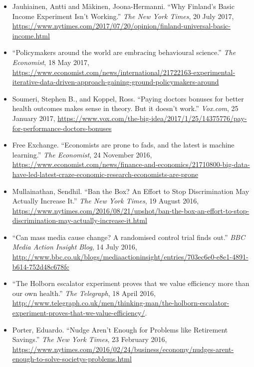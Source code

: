 \documentclass[12pt,a4paper]{article}
\begin{document}
\begin{itemize}
\item Jauhiainen, Antti and M\"{a}kinen, Joona-Hermanni. ``Why Finland's Basic Income Experiment Isn't Working.'' \textit{The New York Times}, 20 July 2017, \url{https://www.nytimes.com/2017/07/20/opinion/finland-universal-basic-income.html}

\item ``Policymakers around the world are embracing behavioural science.'' \textit{The Economist}, 18 May 2017, \url{https://www.economist.com/news/international/21722163-experimental-iterative-data-driven-approach-gaining-ground-policymakers-around}

\item Soumeri, Stephen B., and Koppel, Ross. ``Paying doctors bonuses for better health outcomes makes sense in theory. But it doesn't work.'' \textit{Vox.com}, 25 January 2017, \url{https://www.vox.com/the-big-idea/2017/1/25/14375776/pay-for-performance-doctors-bonuses}

\item Free Exchange. ``Economists are prone to fads, and the latest is machine learning.'' \textit{The Economist}, 24 November 2016, \url{https://www.economist.com/news/finance-and-economics/21710800-big-data-have-led-latest-craze-economic-research-economists-are-prone}

\item Mullainathan, Sendhil. ``Ban the Box? An Effort to Stop Discrimination May Actually Increase It.'' \textit{The New York Times}, 19 August 2016, \url{https://www.nytimes.com/2016/08/21/upshot/ban-the-box-an-effort-to-stop-discrimination-may-actually-increase-it.html}

\item ``Can mass media cause change? A randomised control trial finds out.'' \textit{BBC Media Action Insight Blog}, 14 July 2016, \url{http://www.bbc.co.uk/blogs/mediaactioninsight/entries/703ec6e0-e8e1-4891-b614-752d48c678fc}

\item ``The Holborn escalator experiment proves that we value efficiency more than our own health.'' \textit{The Telegraph}, 18 April 2016, \url{http://www.telegraph.co.uk/men/thinking-man/the-holborn-escalator-experiment-proves-that-we-value-efficiency/}.

\item Porter, Eduardo. ``Nudge Aren't Enough for Problems like Retirement Savings.'' \textit{The New York Times}, 23 February 2016, \url{https://www.nytimes.com/2016/02/24/business/economy/nudges-arent-enough-to-solve-societys-problems.html}


\end{itemize}
\end{document}
